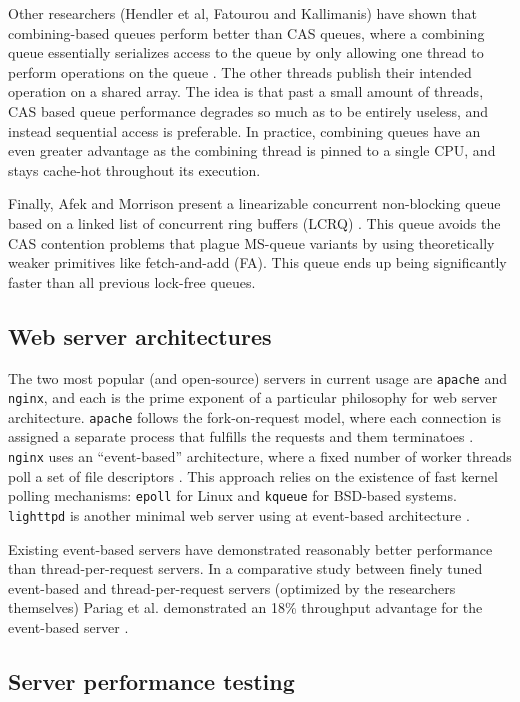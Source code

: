 \documentclass[twoside,10pt]{article}
\begin{document}
\begin{multicols}{2}
Other researchers (Hendler et al, Fatourou and Kallimanis) have shown
that combining-based queues perform better than CAS queues, where a
combining queue essentially serializes access to the queue by only
allowing one thread to perform operations on the queue \cite{He10,
  FK12}. The other threads publish their intended operation on a
shared array. The idea is that past a small amount of threads, CAS
based queue performance degrades so much as to be entirely useless,
and instead sequential access is preferable. In practice, combining
queues have an even greater advantage as the combining thread is
pinned to a single CPU, and stays cache-hot throughout its execution.

Finally, Afek and Morrison present a linearizable concurrent
non-blocking queue based on a linked list of concurrent ring buffers
(LCRQ) \cite{AM13}. This queue avoids the CAS contention problems that
plague MS-queue variants by using theoretically weaker primitives like
fetch-and-add (FA). This queue ends up being significantly faster than
all previous lock-free queues.

\subsection{Web server architectures}

The two most popular (and open-source) servers in current usage are
\verb+apache+ and \verb+nginx+, and each is the prime exponent of a
particular philosophy for web server architecture. \verb+apache+
follows the fork-on-request model, where each connection is assigned a
separate process that fulfills the requests and them terminatoes
\cite{fielding1997apache}. \verb+nginx+ uses an ``event-based''
architecture, where a fixed number of worker threads poll a set of
file descriptors \cite{syosevnginx}. This approach relies on the
existence of fast kernel polling mechanisms: \verb+epoll+ for Linux
and \verb+kqueue+ for BSD-based systems. \verb+lighttpd+ is another
minimal web server using at event-based architecture
\cite{kneschke2003lighttpd}.

Existing event-based servers have demonstrated reasonably better
performance than thread-per-request servers. In a comparative study
between finely tuned event-based and thread-per-request servers
(optimized by the researchers themselves) Pariag et al. demonstrated
an 18\% throughput advantage for the event-based server
\cite{paraig2007comparing}.

\subsection{Server performance testing}


\end{multicols}
\end{document}
